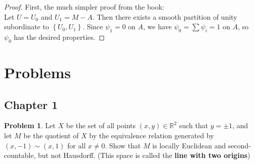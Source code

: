 \documentclass[reqno]{amsart}
\theoremstyle{plain}%
\theoremstyle{definition}
\newtheorem{problem}[theorem]{Problem}
\theoremstyle{remark}
\begin{document}
        \begin{proof}
            First, the much simpler proof from the book:\\
            Let $U = U_0$ and $U_1 = M - A$. Then there exists
            a smooth partition of unity subordinate to $\left\{ U_0, U_1
            \right\} $. Since $\psi_1 = 0$ on $A$, we have
            $\psi_0 = \sum \psi_i = 1$ on $A$, so
            $\psi_0$ has the desired properties.
        \end{proof}


        




    \section*{Problems}

    \subsection{Chapter 1}
    \begin{problem}
        Let $X$ be the set of all points
        $(x,y) \in \mathbb{R}^2$ such that
        $y = \pm 1$, and let $M$ be the quotient of
        $X$ by the equivalence relation generated
        by $\left( x,-1 \right) \sim \left( x,1 \right) $ 
        for all $x\neq 0$. Show that $M$ is locally Euclidean
        and second-countable, but not Hausdorff.
        (This space is called the \textbf{line with two
        origins})
    \end{problem}
\end{document}
